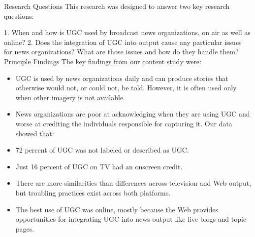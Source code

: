 Research Questions
This research was designed to answer two key research questions: 
\begin{enumerate}
1. When and how is UGC used by broadcast news organizations,
on air as well as online?
2. Does the integration of UGC into output cause any particular
issues for news organizations? What are those issues and how do
they handle them?
Principle Findings
The key findings from our content study were:
\begin{itemize}
\item UGC is used by news organizations daily and can produce stories
that otherwise would not, or could not, be told. However, it
is often used only when other imagery is not available.
\item News organizations are poor at acknowledging when they are
using UGC and worse at crediting the individuals responsible for
capturing it. Our data showed that:
\item 72 percent of UGC was not labeled or described as UGC.
\item Just 16 percent of UGC on TV had an onscreen credit.
\item There are more similarities than differences across television and
Web output, but troubling practices exist across both platforms.
\item The best use of UGC was online, mostly because the Web provides
opportunities for integrating UGC into news output like
live blogs and topic pages.
\end{itemize}


\end{enumerate}
